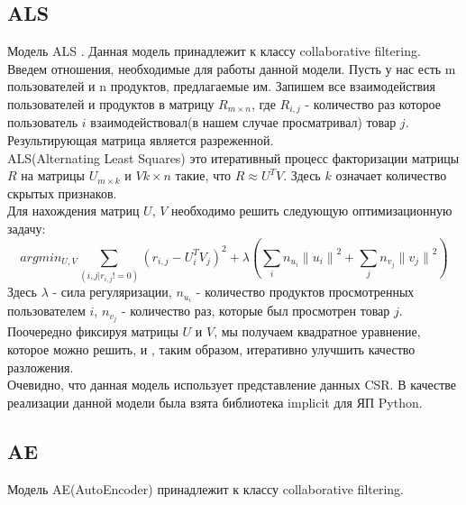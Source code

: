 \documentclass[14pt]{mmcs_article}
\begin{document}
\subsection{ALS}
Модель ALS \cite{ALSA1}. Данная модель принадлежит к классу collaborative filtering. \\
Введем отношения, необходимые для работы данной модели. Пусть у нас есть m пользователей и n продуктов, предлагаемые им. Запишем все взаимодействия пользователей и продуктов в матрицу $R_{m \times n}$, где $R_{i,j}$ - количество раз которое пользователь $i$ взаимодействовал(в нашем случае просматривал) товар $j$. Результирующая матрица является разреженной. \\
ALS(Alternating Least Squares) это итеративный процесс факторизации матрицы $R$ на матрицы $U_{m \times k}$ и $V{k \times n}$ такие, что  $R \approx U^TV$. Здесь $k$ означает количество скрытых признаков.\\
Для нахождения матриц $U$, $V$ необходимо решить следующую оптимизационную задачу: 
\begin{equation}
argmin_{U,V} \sum_{(i,j|r_{i,j} != 0)} (r_{i,j} - U_i^TV_j)^2 + \lambda (\sum_i n_{u_i} {\parallel u_i \parallel} ^2 + \sum_j n_{v_j} {\parallel v_j \parallel} ^2) 
\end{equation}
Здесь $\lambda$ - сила регуляризации, $n_{u_i}$ - количество продуктов просмотренных пользователем $i$,  $n_{v_j}$ - количество раз, которые был просмотрен товар $j$. \\
Поочередно фиксируя матрицы $U$ и $V$, мы получаем квадратное уравнение, которое можно решить, и , таким образом, итеративно улучшить качество разложения. \\
Очевидно, что данная модель использует представление данных CSR. В качестве реализации данной модели была взята библиотека implicit \cite{ALSA2} для ЯП Python.
\\

\subsection{AE}
Модель AE(AutoEncoder) принадлежит к классу collaborative filtering. \\
\end{document}

